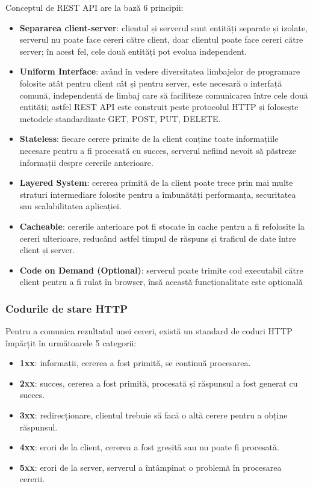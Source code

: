 \par
Conceptul de REST API are la bază 6 principii:
\begin{itemize}
    \item \textbf{Separarea client-server}: clientul și serverul sunt entități separate și izolate,
    serverul nu poate face cereri către client, doar clientul poate face cereri către server; 
    în acest fel, cele două entități pot evolua independent.
    \item \textbf{Uniform Interface}: având în vedere diversitatea limbajelor de programare folosite
    atât pentru client cât și pentru server, este necesară o interfață comună, independentă de limbaj
    care să faciliteze comunicarea între cele două entități; astfel REST API este construit peste 
    protocolul HTTP și folosește metodele standardizate GET, POST, PUT, DELETE.
    \item \textbf{Stateless}: fiecare cerere primite de la client conține toate informațiile necesare
    pentru a fi procesată cu succes, serverul nefiind nevoit să păstreze informații despre cererile
    anterioare.
    \item \textbf{Layered System}: cererea primită de la client poate trece prin mai multe straturi
    intermediare folosite pentru a îmbunătăți performanța, securitatea sau scalabilitatea aplicației.
    \item \textbf{Cacheable}: cererile anterioare pot fi stocate în cache pentru a fi refolosite
    la cereri ulterioare, reducând astfel timpul de răspuns și traficul de date între client și server.
    \item \textbf{Code on Demand (Optional)}: serverul poate trimite cod executabil către client pentru
    a fi rulat în browser, însă această funcționalitate este opțională
\end{itemize}

\subsubsection{Codurile de stare HTTP}
Pentru a comunica rezultatul unei cereri, există un standard de coduri HTTP împărțit în
următoarele 5 categorii:
\begin{itemize}
    \item \textbf{1xx}: informații, cererea a fost primită, se continuă procesarea.
    \item \textbf{2xx}: succes, cererea a fost primită, procesată și răspunsul a fost generat cu succes.
    \item \textbf{3xx}: redirecționare, clientul trebuie să facă o altă cerere pentru a obține răspunsul.
    \item \textbf{4xx}: erori de la client, cererea a fost greșită sau nu poate fi procesată.
    \item \textbf{5xx}: erori de la server, serverul a întâmpinat o problemă în procesarea cererii.
\end{itemize}


